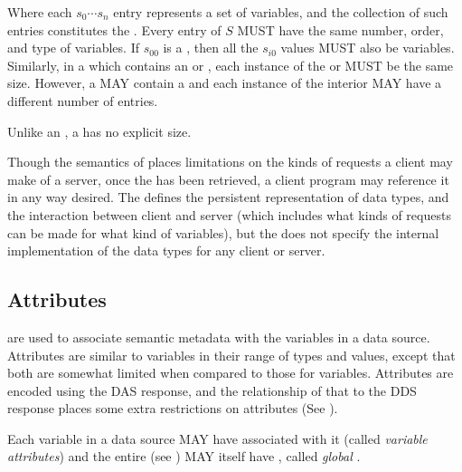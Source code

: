 \documentclass[justify]{nasa-ese}
\renewcommand{\new}[1]{\emph{#1}}
\begin{document}
Where each $s_0 \cdots s_n$ entry represents a set of \DAP variables,
and the collection of such entries constitutes the \Sequence. Every
entry of \Sequence $S$ MUST have the same number, order, and type of
variables. If $s_{0 0}$ is a , then all the $s_{i 0}$
values MUST also be  variables. Similarly, in a
\Sequence which contains an \Array or \Structure, each instance of the
\Array or \Structure MUST be the same size. However, a \Sequence MAY
contain a \Sequence and each instance of the interior \Sequence MAY
have a different number of entries.

Unlike an \Array, a \Sequence has no explicit size.

Though the semantics of \Sequences places limitations on the kinds of
requests a client may make of a server, once the \Sequence has been
retrieved, a client program may reference it in any way desired. The \DAP
defines the persistent representation of data types, and the interaction
between client and server (which includes what kinds of requests can be made
for what kind of variables), but the \DAP does not specify the internal
implementation of the data types for any client or server.

\subsection{Attributes}
\label{sec-Attributes}

\Attributes are used to associate semantic metadata with the variables in a
data source. Attributes are similar to variables in their range of types and
values, except that both are somewhat limited when compared to those for
variables. Attributes are encoded using the DAS response, and the
relationship of that to the DDS response places some extra restrictions on
attributes (See ).


Each variable in a data source MAY have \Attributes associated with it
(called \new{variable attributes}) and the entire \Dataset (see
) MAY itself have \Attributes, called
\new{global \Attributes}.
\end{document}
